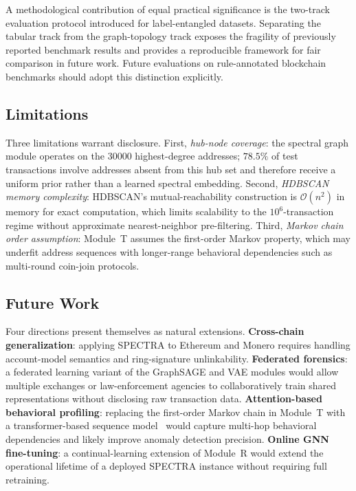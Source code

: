 \documentclass[journal]{IEEEtran}
\newcommand{\spectra}{\textsc{SPECTRA}}
\begin{document}
A methodological contribution of equal practical significance is the
two-track evaluation protocol introduced for label-entangled datasets.
Separating the tabular track from the graph-topology track exposes
the fragility of previously reported benchmark results and provides a
reproducible framework for fair comparison in future work.
Future evaluations on rule-annotated blockchain benchmarks should adopt
this distinction explicitly.

\subsection*{Limitations}

Three limitations warrant disclosure.
First, \emph{hub-node coverage}: the spectral graph module operates on the
\num{30000} highest-degree addresses; $78.5\%$ of test transactions involve
addresses absent from this hub set and therefore receive a uniform prior
rather than a learned spectral embedding.
Second, \emph{HDBSCAN memory complexity}: HDBSCAN's mutual-reachability
construction is $\mathcal{O}(n^2)$ in memory for exact computation, which
limits scalability to the $10^6$-transaction regime without approximate
nearest-neighbor pre-filtering.
Third, \emph{Markov chain order assumption}: Module~T assumes the first-order
Markov property, which may underfit address sequences with longer-range
behavioral dependencies such as multi-round coin-join protocols.

\subsection*{Future Work}

Four directions present themselves as natural extensions.
\textbf{Cross-chain generalization}: applying \spectra{} to Ethereum and
Monero requires handling account-model semantics and ring-signature
unlinkability.
\textbf{Federated forensics}: a federated learning variant of the GraphSAGE
and VAE modules would allow multiple exchanges or law-enforcement agencies to
collaboratively train shared representations without disclosing raw transaction
data.
\textbf{Attention-based behavioral profiling}: replacing the first-order
Markov chain in Module~T with a transformer-based sequence model~\cite{Yang2023}
would capture multi-hop behavioral dependencies and likely improve anomaly
detection precision.
\textbf{Online GNN fine-tuning}: a continual-learning extension of Module~R
would extend the operational lifetime of a deployed \spectra{} instance without
requiring full retraining.

\FloatBarrier



\end{document}
